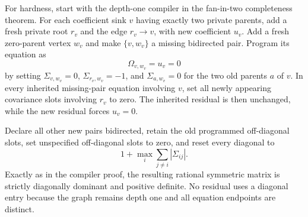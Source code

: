 For hardness, start with the depth-one compiler in the fan-in-two completeness theorem.  For each coefficient sink \(v\) having exactly two private parents, add a fresh private root \(r_v\) and the edge \(r_v\to v\), with new coefficient \(u_v\).  Add a fresh zero-parent vertex \(w_v\) and make \(\{v,w_v\}\) a missing bidirected pair.  Program its equation as
\[
\Omega_{v,w_v}=u_v=0
\]
by setting \(\Sigma_{v,w_v}=0\), \(\Sigma_{r_v,w_v}=-1\), and \(\Sigma_{a,w_v}=0\) for the two old parents \(a\) of \(v\).  In every inherited missing-pair equation involving \(v\), set all newly appearing covariance slots involving \(r_v\) to zero.  The inherited residual is then unchanged, while the new residual forces \(u_v=0\).

Declare all other new pairs bidirected, retain the old programmed off-diagonal slots, set unspecified off-diagonal slots to zero, and reset every diagonal to
\[
1+\max_i\sum_{j\ne i}|\Sigma_{ij}|.
\]
Exactly as in the compiler proof, the resulting rational symmetric matrix is strictly diagonally dominant and positive definite.  No residual uses a diagonal entry because the graph remains depth one and all equation endpoints are distinct.

